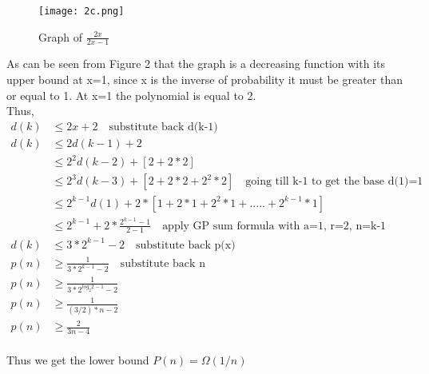 \documentclass[12pt]{article}
\begin{document}
\begin{figure}[h]
    \centering
    \texttt{[image: 2c.png]}
    \caption{Graph of $\frac{2x}{2x-1}$}
    \label{fig:my_image}
\end{figure}

As can be seen from Figure 2 that the graph is a decreasing function with its upper bound at x=1, since x is the inverse of probability it must be greater than or equal to 1. At x=1 the polynomial is equal to 2. \\
Thus, 
\begin{align*}
    d(k) &\leq 2x + 2 \quad \text{substitute back d(k-1)} \\
    d(k) &\leq 2d(k-1) + 2 \\
    &\leq 2^2d(k-2) + [2 + 2*2] \\ 
    &\leq 2^3d(k-3) + [2 + 2*2 + 2^2*2] \quad \text{going till k-1 to get the base d(1)=1} \\
    &\leq 2^{k-1}d(1) + 2*[1+2*1+2^2*1+.....+2^{k-1}*1] \\
    &\leq 2^{k-1} + 2*\frac{2^{k-1}-1}{2-1} \quad \text{apply GP sum formula with a=1, r=2, n=k-1} \\
    d(k) &\leq 3*2^{k-1} - 2 \quad \text{substitute back p(x)} \\
    p(n) &\geq \frac{1}{3*2^{k-1} - 2} \quad \text{substitute back n} \\
     p(n) &\geq \frac{1}{3*2^{log_{2}2-1} -2 } \\
     p(n) &\geq \frac{1}{(3/2)*n-2} \\
     p(n) &\geq \frac{2}{3n-4} \\
\end{align*}

Thus we get the lower bound \(P(n)=\Omega( 1/n)\)
\end{document}
